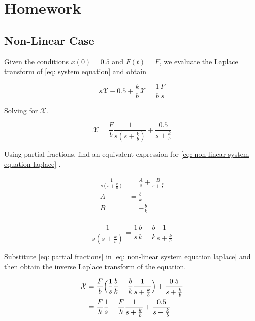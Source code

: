 \section{Homework}

\subsection{Non-Linear Case}

Given the conditions $x(0) = 0.5$ and $F(t) = F$, we 
evaluate the Laplace transform of \ref{eq: system equation} 
and obtain

\begin{equation}
  s \mathcal{X} - 0.5 + \frac{k}{b} \mathcal{X} = 
\frac{1}{b} \frac{F}{s}
\end{equation}

Solving for $\mathcal{X}$.

\begin{equation}
 \mathcal{X} = \frac{F}{b}
\frac{1}{s(s+\frac{k}{b})} + \frac{0.5}{s+\frac{k}{b}} 
\label{eq: non-linear system equation laplace}
\end{equation}

Using partial fractions, find an equivalent expression for 
\ref{eq: non-linear system equation laplace} .

\begin{equation*}
 \begin{split}
  \frac{1}{s(s+\frac{k}{b})}  & = \frac{A}{s} + 
\frac{B}{s+\frac{k}{b}}\\
A & = \frac{b}{k}\\
B &= -\frac{b}{k}\\
 \end{split}
\end{equation*}

\begin{equation}
 \frac{1}{s(s+\frac{k}{b})}   = \frac{1}{s} \frac{b}{k} - 
\frac{b}{k}
\frac{1}{s+\frac{k}{b}}
\label{eq: partial fractions}
\end{equation}

Substitute \ref{eq: partial fractions} in \ref{eq: 
non-linear system equation laplace} and then obtain the 
inverse Laplace transform of the equation.

\begin{equation*}
 \begin{split}
   \mathcal{X} & = \frac{F}{b}
\Bigl ( \frac{1}{s} \frac{b}{k} - 
\frac{b}{k}
\frac{1}{s+\frac{k}{b}} \Bigr) + \frac{0.5}{s+\frac{k}{b}} 
\\
& = \frac{F}{k} \frac{1}{s}  - 
\frac{F}{k}
\frac{1}{s+\frac{k}{b}} + \frac{0.5}{s+\frac{k}{b}} 
\\
 \end{split}
\end{equation*}

